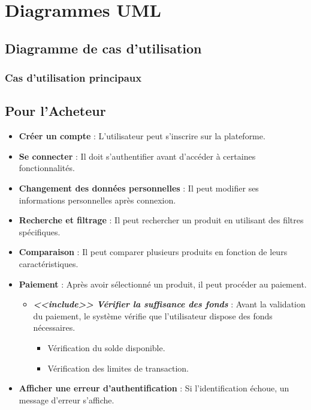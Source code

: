 \documentclass[a4paper,12pt]{article}
\newcounter{subsubsubsection}[subsubsection]
\begin{document}
\section{Diagrammes UML}
\subsection{Diagramme de cas d'utilisation}
\subsubsection{Cas d'utilisation principaux}

\subsection{Pour l'Acheteur}
\begin{itemize}
    \item \textbf{Créer un compte} : L'utilisateur peut s'inscrire sur la plateforme.
    \item \textbf{Se connecter} : Il doit s'authentifier avant d'accéder à certaines fonctionnalités.
    \item \textbf{Changement des données personnelles} : Il peut modifier ses informations personnelles après connexion.
    \item \textbf{Recherche et filtrage} : Il peut rechercher un produit en utilisant des filtres spécifiques.
    \item \textbf{Comparaison} : Il peut comparer plusieurs produits en fonction de leurs caractéristiques.
    \item \textbf{Paiement} : Après avoir sélectionné un produit, il peut procéder au paiement.
    \begin{itemize}
        \item \textit{\textbf{<<include>> Vérifier la suffisance des fonds}} : Avant la validation du paiement, le système vérifie que l'utilisateur dispose des fonds nécessaires.
        \begin{itemize}
            \item Vérification du solde disponible.
            \item Vérification des limites de transaction.
        \end{itemize}
    \end{itemize}
    \item \textbf{Afficher une erreur d'authentification} : Si l'identification échoue, un message d'erreur s'affiche.
\end{itemize}
\end{document}
